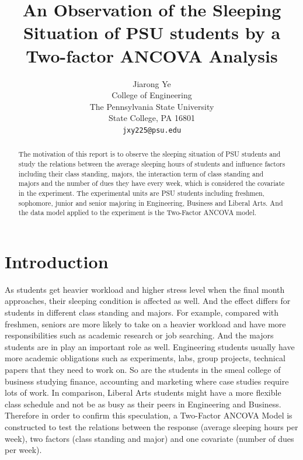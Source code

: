 \documentclass{article} %
\title{An Observation of the Sleeping Situation of PSU students by  a Two-factor ANCOVA Analysis}
\author{
Jiarong Ye \\
College of Engineering\\
The Pennsylvania State University\\
State College, PA 16801 \\
\texttt{jxy225@psu.edu} \\
}
\begin{document}
\maketitle

\begin{abstract}
The motivation of this report is to observe the sleeping situation of PSU students and study the relations between the average sleeping hours of students and influence factors including their class standing, majors, the interaction term of class standing and majors and the number of dues they have every week, which is considered the covariate in the experiment. The experimental units are PSU students including freshmen, sophomore, junior and senior majoring in Engineering, Business and Liberal Arts. And the data model applied to the experiment is the Two-Factor ANCOVA model.

\end{abstract}

\section{Introduction}



As students get heavier workload and higher stress level when the final month approaches, their sleeping condition is affected as well. And the effect differs for students in different class standing and majors. For example, compared with freshmen, seniors are more likely to take on a heavier workload and have more responsibilities such as academic research or job searching. And the majors students are in play an important role as well. Engineering students usually have more academic obligations such as experiments, labs, group projects, technical papers that they need  to work on. So are the students in the smeal college of business studying finance, accounting and marketing where case studies require lots of work. In comparison, Liberal Arts students might have a more flexible class schedule and not be as busy as their peers in Engineering and Business. Therefore in order to confirm this speculation, a Two-Factor ANCOVA Model is constructed to test the relations between the response (average sleeping hours per week), two factors (class standing and major) and one covariate (number of dues per week). 
\end{document}
